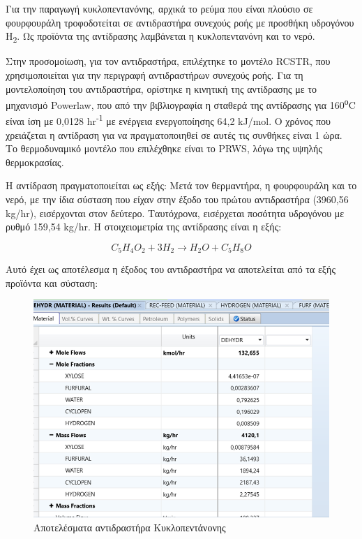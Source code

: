 \documentclass[11pt]{article}
\begin{document}
Για την παραγωγή κυκλοπεντανόνης, αρχικά το ρεύμα που είναι πλούσιο σε
φουρφουράλη τροφοδοτείται σε αντιδραστήρα συνεχούς ροής με προσθήκη
υδρογόνου H\textsubscript{2}. Ως προϊόντα της αντίδρασης λαμβάνεται η κυκλοπεντανόνη
και το νερό.

Στην προσομοίωση, για τον αντιδραστήρα, επιλέχτηκε το μοντέλο RCSTR, που
χρησιμοποιείται για την περιγραφή αντιδραστήρων συνεχούς ροής. Για τη
μοντελοποίηση του αντιδραστήρα, ορίστηκε η κινητική της αντίδρασης με το
μηχανισμό Powerlaw, που από την βιβλιογραφία η σταθερά της αντίδρασης
για 160\textsuperscript{ο}C είναι ίση με 0,0128 hr\textsuperscript{-1} με ενέργεια ενεργοποίησης 64,2
kJ/mol. Ο χρόνος που χρειάζεται η αντίδραση για να πραγματοποιηθεί σε
αυτές τις συνθήκες είναι 1 ώρα. Το θερμοδυναμικό μοντέλο που επιλέχθηκε
είναι το PRWS, λόγω της υψηλής θερμοκρασίας.

Η αντίδραση πραγματοποιείται ως εξής: Μετά τον θερμαντήρα, η φουρφουράλη
και το νερό, με την ίδια σύσταση που είχαν στην έξοδο του πρώτου
αντιδραστήρα (3960,56 kg/hr), εισέρχονται στον δεύτερο. Ταυτόχρονα,
εισέρχεται ποσότητα υδρογόνου με ρυθμό 159,54 kg/hr. Η στοιχειομετρία
της αντίδρασης είναι η εξής:

\[C_{5}H_{4}O_{2}  + 3H_{2}  \rightarrow  H_{2}O +  C_{5}H_{8}O \]

Αυτό έχει ως αποτέλεσμα η έξοδος του αντιδραστήρα να αποτελείται από τα
εξής προϊόντα και σύσταση:

\begin{figure}[htbp]
\centering
\includegraphics[width=.9\linewidth]{Χημικοί_Αντιδραστήρες/2023-01-06_16-54-14_screenshot.png}
\caption{Αποτελέσματα αντιδραστήρα Κυκλοπεντάνονης}
\end{figure}
\end{document}
